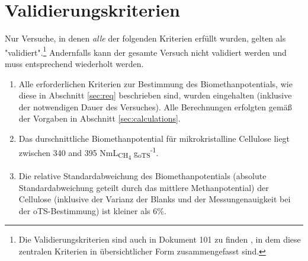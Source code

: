 \documentclass[]{article}
\begin{document}
\section{Validierungskriterien}
\label{sec:crit}
Nur Versuche, in denen \textit{alle} der folgenden Kriterien erfüllt wurden, gelten als "validiert".\footnote{
Die Validierungskriterien sind auch in Dokument 101 zu finden \citep{BMPdoc101val}, in dem diese zentralen Kriterien in übersichtlicher Form zusammengefasst sind.
}
Andernfalls kann der gesamte Versuch nicht validiert werden und muss entsprechend wiederholt werden.

\begin{enumerate}
  \item Alle erforderlichen Kriterien zur Bestimmung des Biomethanpotentials, wie diese in Abschnitt \ref{sec:req} beschrieben sind, wurden eingehalten (inklusive der notwendigen Dauer des Versuches). Alle Berechnungen erfolgten gemäß der Vorgaben in Abschnitt \ref{sec:calculations}.
  \item Das durschnittliche Biomethanpotential für mikrokristalline Cellulose liegt zwischen 340 and 395 NmL\textsubscript{CH\textsubscript{4}} g\textsubscript{oTS}\textsuperscript{-1}.
  \item Die relative Standardabweichung des Biomethanpotentials (absolute Standardabweichung geteilt durch das mittlere Methanpotential) der Cellulose (inklusive der Varianz der Blanks und der Messungenauigkeit bei der oTS-Bestimmung) ist kleiner als 6\%.
\end{enumerate}


\end{document}
